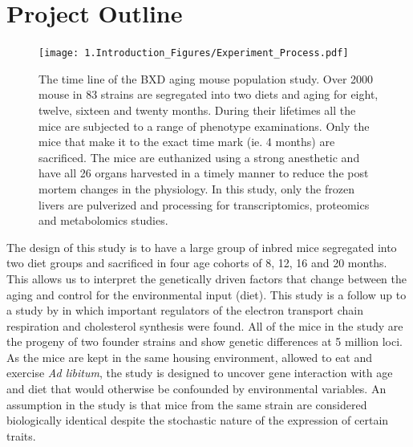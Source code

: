 \documentclass[a4paper,11pt,twoside]{book}
\begin{document}
	\section{Project Outline}
	
	\begin{figure}[htb!]
		\centering
		\texttt{[image: 1.Introduction\_Figures/Experiment\_Process.pdf]}
		\caption{The time line of the BXD aging mouse population study. Over 2000 mouse in 83 strains are segregated into two diets and aging for eight, twelve, sixteen and twenty months. During their lifetimes all the mice are subjected to a range of phenotype examinations. Only the mice that make it to the exact time mark (ie. 4 months) are sacrificed. The  mice are euthanized using a strong anesthetic and have all 26 organs harvested in a timely manner to reduce the post mortem changes in the physiology. In this study, only the frozen livers are pulverized and processing for transcriptomics, proteomics and metabolomics studies.}
		\label{fig: Outline of the BXD Aging Population Study}
	\end{figure}
	
    The design of this study is to have a large group of inbred mice segregated into two diet groups and sacrificed in four age cohorts of 8, 12, 16 and 20 months. This allows us to interpret the genetically driven factors that change between the aging and control for the environmental input (diet). This study is a follow up to a study by \citet{Williams2016SystemsFunction} in which important regulators of the electron transport chain respiration and cholesterol synthesis were found. All of the mice in the study are the progeny of two founder strains and show genetic differences at 5 million loci. As the mice are kept in the same housing environment, allowed to eat and exercise \textit{Ad libitum}, the study is designed to uncover gene interaction with age and diet that would otherwise be confounded by environmental variables. An assumption in the study is that mice from the same strain are considered biologically identical despite the stochastic nature of the expression of certain traits\citep{Czyz2012Geneticdifferences}.
    
\end{document}
